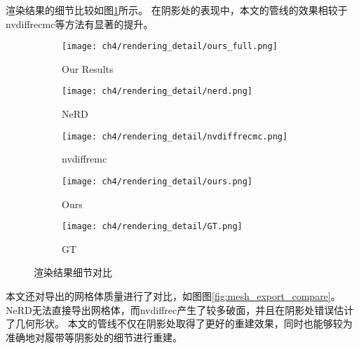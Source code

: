 渲染结果的细节比较如图\ref{fig:rendering_detail_compare}所示。
在阴影处的表现中，本文的管线的效果相较于nvdiffrecmc等方法有显著的提升。

\begin{figure}[H]
  \centering
  \begin{subfigure}[c]{0.32\textwidth}
    \centering
    \texttt{[image: ch4/rendering\_detail/ours\_full.png]}
    \caption{Our Results}
  \end{subfigure}
  \begin{subfigure}[c]{0.16\textwidth}
    \centering
    \texttt{[image: ch4/rendering\_detail/nerd.png]}
    \caption{NeRD}
  \end{subfigure}
  \hspace{0.1mm}
  \begin{subfigure}[c]{0.16\textwidth}
    \centering
    \texttt{[image: ch4/rendering\_detail/nvdiffrecmc.png]}
    \caption{nvdiffremc}
  \end{subfigure}
  \hspace{0.1mm}
  \begin{subfigure}[c]{0.16\textwidth}
    \centering
    \texttt{[image: ch4/rendering\_detail/ours.png]}
    \caption{Ours}
  \end{subfigure}
  \hspace{0.1mm}
  \begin{subfigure}[c]{0.16\textwidth}
    \centering
    \texttt{[image: ch4/rendering\_detail/GT.png]}
    \caption{GT}
  \end{subfigure}
  \caption{渲染结果细节对比}
  \label{fig:rendering_detail_compare}
\end{figure}

本文还对导出的网格体质量进行了对比，如图图\ref{fig:mesh_export_compare}。
NeRD无法直接导出网格体，而nvdiffrec产生了较多破面，并且在阴影处错误估计了几何形状。
本文的管线不仅在阴影处取得了更好的重建效果，同时也能够较为准确地对履带等阴影处的细节进行重建。

